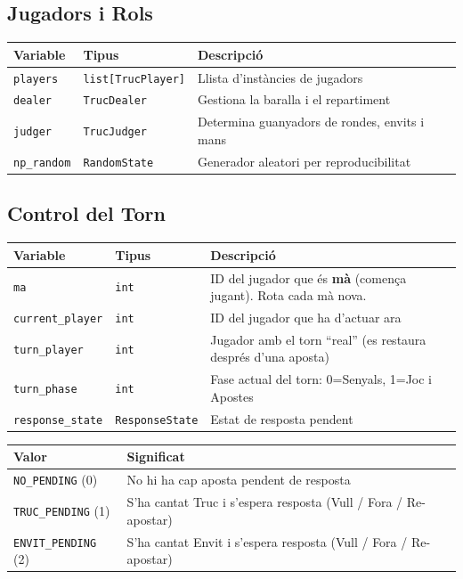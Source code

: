 \documentclass[a4paper,11pt]{report}
\begin{document}
\subsection{Jugadors i Rols}

\begin{longtable}{|l|l|p{6cm}|}
\hline
\textbf{Variable} & \textbf{Tipus} & \textbf{Descripció} \\
\hline
\texttt{players} & \texttt{list[TrucPlayer]} & Llista d'instàncies de jugadors \\
\texttt{dealer} & \texttt{TrucDealer} & Gestiona la baralla i el repartiment \\
\texttt{judger} & \texttt{TrucJudger} & Determina guanyadors de rondes, envits i mans \\
\texttt{np\_random} & \texttt{RandomState} & Generador aleatori per reproducibilitat \\
\hline
\end{longtable}

\subsection{Control del Torn}

\begin{longtable}{|l|l|p{6cm}|}
\hline
\textbf{Variable} & \textbf{Tipus} & \textbf{Descripció} \\
\hline
\texttt{ma} & \texttt{int} & ID del jugador que és \textbf{mà} (comença jugant). Rota cada mà nova. \\
\texttt{current\_player} & \texttt{int} & ID del jugador que ha d'actuar ara \\
\texttt{turn\_player} & \texttt{int} & Jugador amb el torn ``real'' (es restaura després d'una aposta) \\
\texttt{turn\_phase} & \texttt{int} & Fase actual del torn: 0=Senyals, 1=Joc i Apostes \\
\texttt{response\_state} & \texttt{ResponseState} & Estat de resposta pendent \\
\hline
\end{longtable}

\begin{longtable}{|l|p{10cm}|}
\hline
\textbf{Valor} & \textbf{Significat} \\
\hline
\texttt{NO\_PENDING} (0) & No hi ha cap aposta pendent de resposta \\
\texttt{TRUC\_PENDING} (1) & S'ha cantat Truc i s'espera resposta (Vull / Fora / Re-apostar) \\
\texttt{ENVIT\_PENDING} (2) & S'ha cantat Envit i s'espera resposta (Vull / Fora / Re-apostar) \\
\hline
\end{longtable}
\end{document}
